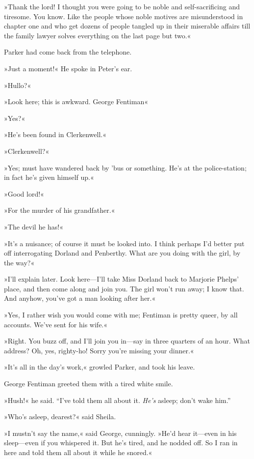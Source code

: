 »Thank the lord! I thought you were going to be noble and self-sacrificing and tiresome. You know. Like the people whose noble motives are misunderstood in chapter one and who get dozens of people tangled up in their miserable affairs till the family lawyer solves everything on the last page but two.«

Parker had come back from the telephone.

»Just a moment!« He spoke in Peter's ear.

»Hullo?«

»Look here; this is awkward. George Fentiman\longdash«

»Yes?«

»He's been found in Clerkenwell.«

»Clerkenwell?«

»Yes; must have wandered back by 'bus or something. He's at the police-station; in fact he's given himself up.«

»Good lord!«

»For the murder of his grandfather.«

»The devil he has!«

»It's a nuisance; of course it must be looked into. I think perhaps I'd better put off interrogating Dorland and Penberthy. What are you doing with the girl, by the way?«

»I'll explain later. Look here\allowbreak---\allowbreak I'll take Miss Dorland back to Marjorie Phelps' place, and then come along and join you. The girl won't run away; I know that. And anyhow, you've got a man looking after her.«

»Yes, I rather wish you would come with me; Fentiman is pretty queer, by all accounts. We've sent for his wife.«

»Right. You buzz off, and I'll join you in\allowbreak---\allowbreak say in three quarters of an hour. What address? Oh, yes, righty-ho! Sorry you're missing your dinner.«

»It's all in the day's work,« growled Parker, and took his leave.

George Fentiman greeted them with a tired white smile.

»Hush!« he said. \enquote{I've told them all about it. \textit{He's} asleep; don't wake him.}

»Who's asleep, dearest?« said Sheila.

»I mustn't say the name,« said George, cunningly. »He'd hear it\allowbreak---\allowbreak even in his sleep\allowbreak---\allowbreak even if you whispered it. But he's tired, and he nodded off. So I ran in here and told them all about it while he snored.«

